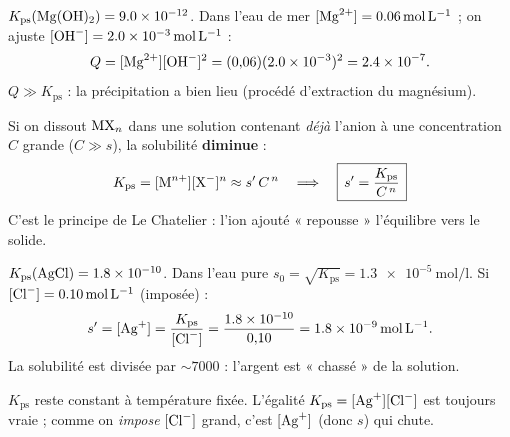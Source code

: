 \documentclass[11pt,a4paper]{article}
\begin{document}
\begin{exemplebox}
$K_{\mathrm{ps}}(\ce{Mg(OH)2})=\num{9.0e-12}$. Dans l'eau de mer $[\ce{Mg^{2+}}]=\qty{0.06}{\mole\per\litre}$ ;
on ajuste $[\ce{OH-}]=\qty{2.0e-3}{\mole\per\litre}$ :
\[ Q=[\ce{Mg^{2+}}][\ce{OH-}]^{2}=(0{,}06)(\num{2.0e-3})^{2}=\num{2.4e-7}. \]
$Q\gg K_{\mathrm{ps}}$ : la précipitation a bien lieu (procédé d'extraction du magnésium).
\end{exemplebox}

\begin{cle}
Si on dissout $\ce{MX_n}$ dans une solution contenant \emph{déjà} l'anion  à une concentration
$C$ grande ($C\gg s$), la solubilité \textbf{diminue} :
\[ K_{\mathrm{ps}}=[\ce{M^{n+}}][\ce{X-}]^{n}\approx s'\,C^{\,n}
   \quad\Longrightarrow\quad \boxed{\,s' = \dfrac{K_{\mathrm{ps}}}{C^{\,n}}\,} \]
C'est le principe de Le Chatelier : l'ion ajouté « repousse » l'équilibre vers le solide.
\end{cle}

\begin{exemplebox}
$K_{\mathrm{ps}}(\ce{AgCl})=\num{1.8e-10}$. Dans l'eau pure $s_0=\sqrt{K_{\mathrm{ps}}}=\qty{1.3e-5}{\mole\per\litre}$.
Si $[\ce{Cl-}]=\qty{0.10}{\mole\per\litre}$ (imposée) :
\[ s'=[\ce{Ag+}]=\dfrac{K_{\mathrm{ps}}}{[\ce{Cl-}]}=\dfrac{\num{1.8e-10}}{0{,}10}=\qty{1.8e-9}{\mole\per\litre}. \]
La solubilité est divisée par $\sim 7000$ : l'argent est « chassé » de la solution.
\end{exemplebox}

\begin{piege}
$K_{\mathrm{ps}}$ reste constant à température fixée. L'égalité $K_{\mathrm{ps}}=[\ce{Ag+}][\ce{Cl-}]$
est toujours vraie ; comme on \emph{impose} $[\ce{Cl-}]$ grand, c'est $[\ce{Ag+}]$ (donc $s$) qui chute.
\end{piege}
\end{document}
